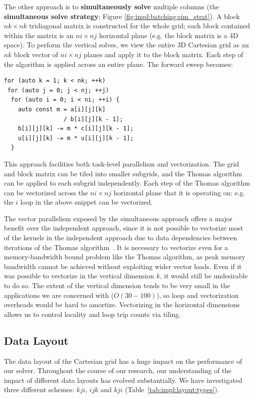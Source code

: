 \documentclass{sig-alternate}
\begin{document}
The other approach is to \textbf{simultaneously solve} multiple columns (the
  \textbf{simultaneous solve strategy}; Figure
  \ref{fig:impl:batching:sim_strat}).
A block \(nk \times nk\) tridiagonal matrix is constructed for the whole grid;
  each block contained within the matrix is an \(ni \times nj\) horizontal plane
  (e.g. the block matrix is a 4D space).
To perform the vertical solves, we view the entire 3D Cartesian grid as an
  \(nk\) block vector of \(ni \times nj\) planes and apply it to the block
  matrix.
Each step of the algorithm is applied across an entire plane.
The forward sweep becomes:
\begin{lstlisting}
for (auto k = 1; k < nk; ++k)
 for (auto j = 0; j < nj; ++j)
  for (auto i = 0; i < ni; ++i) {
    auto const m = a[i][j][k]
                 / b[i][j][k - 1];
    b[i][j][k] -= m * c[i][j][k - 1];
    u[i][j][k] -= m * u[i][j][k - 1];
  } 
\end{lstlisting}
This approach facilities both task-level parallelism and vectorization.
The grid and block matrix can be tiled into smaller subgrids, and the Thomas
  algorithm can be applied to each subgrid independently.
Each step of the Thomas algorithm can be vectorized across the \(ni \times nj\)
  horizontal plane that it is operating on: e.g. the \(i\) loop in the
  above snippet can be vectorized.

The vector parallelism exposed by the simultaneous approach offers a major
  benefit over the independent approach, since it is not possible to vectorize
  most of the kernels in the independent approach due to data dependencies
  between iterations of the Thomas algorithm~\cite{pipelined_thomas_algorithm}.
It is necessary to vectorize even for a memory-bandwidth bound problem like the
  Thomas algorithm, as peak memory bandwidth cannot be achieved without
  exploiting wider vector loads.
Even if it was possible to vectorize in the vertical dimension \(k\), it would
  still be undesirable to do so.
The extent of the vertical dimension tends to be very small in the applications
  we are concerned with (\(O(30-100)\)), so loop and vectorization overheads
  would be hard to amortize.
Vectorizing in the horizontal dimensions allows us to control locality and loop
  trip counts via tiling.

\subsection{Data Layout}
\label{sec:impl:data_layout}

The data layout of the Cartesian grid has a huge impact on the performance
  of our solver.
Throughout the course of our research, our understanding of the impact of
  different data layouts has evolved substantially.
We have investigated three different schemes: \(kji\), \(ijk\) and \(kji\)
  (Table~\ref{tab:impl:layout:types}).
\end{document}
